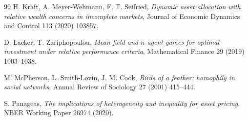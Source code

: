 \documentclass[12pt]{article}
\theoremstyle{definition}
\theoremstyle{remark}
\begin{document}
\begin{thebibliography}{99}
 H. Kraft, A. Meyer-Wehmann, F. T. Seifried,
\emph{Dynamic asset allocation with relative wealth concerns in incomplete
markets},
Journal of Economic Dynamics and Control 113 (2020) 103857.

 D. Lacker, T. Zariphopoulou,
\emph{Mean field and $n$-agent games for optimal investment under relative
performance criteria},
Mathematical Finance 29 (2019) 1003--1038.

 M. McPherson, L. Smith-Lovin, J. M. Cook,
\emph{Birds of a feather: homophily in social networks},
Annual Review of Sociology 27 (2001) 415--444.

 S. Panageas,
\emph{The implications of heterogeneity and inequality for asset pricing},
NBER Working Paper 26974 (2020).

\end{thebibliography}
\end{document}
